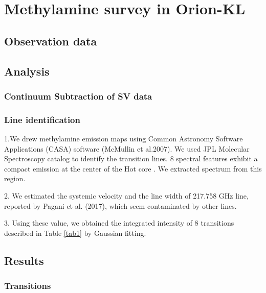 \chapter{Methylamine survey in Orion-KL
\label{chap:Orion-KL}}

\section{Observation data}

\section{Analysis}
\subsection{Continuum Subtraction of SV data}


\subsection{Line identification}

1.We drew methylamine emission maps using Common Astronomy Software Applications (CASA) software (McMullin et al.2007). 
We used JPL Molecular Spectroscopy catalog to identify the transition lines. 
8 spectral features exhibit a compact emission at the center of the Hot core . 
We extracted spectrum from this region.

2. We estimated the systemic velocity and the line width of 217.758 GHz line, 
reported by Pagani et al. (2017), which seem contaminated by 
other lines.

3. Using these value, we obtained the integrated 
intensity of 8 transitions described in Table \ref{tab1} by Gaussian fitting.



\section{Results}
\subsection{Transitions}

